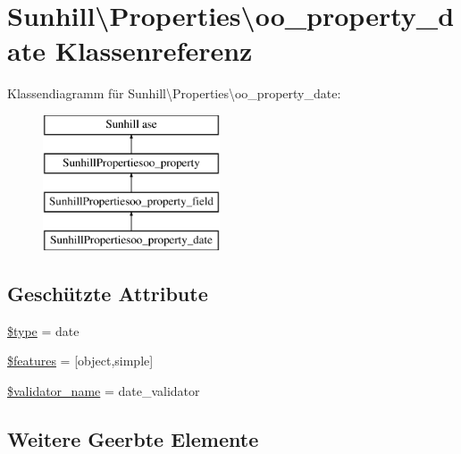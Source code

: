 \hypertarget{classSunhill_1_1Properties_1_1oo__property__date}{}\section{Sunhill\textbackslash{}Properties\textbackslash{}oo\+\_\+property\+\_\+date Klassenreferenz}
\label{classSunhill_1_1Properties_1_1oo__property__date}
Klassendiagramm für Sunhill\textbackslash{}Properties\textbackslash{}oo\+\_\+property\+\_\+date\+:\begin{figure}[H]
\begin{center}
\leavevmode
\includegraphics[height=4.000000cm]{d4/dde/classSunhill_1_1Properties_1_1oo__property__date}
\end{center}
\end{figure}
\subsection*{Geschützte Attribute}
\begin{DoxyCompactItemize}
\item 
\hyperlink{classSunhill_1_1Properties_1_1oo__property__date_a1aed1552ae192d12d6f59a058d6ac50a}{\$type} = \textquotesingle{}date\textquotesingle{}
\item 
\hyperlink{classSunhill_1_1Properties_1_1oo__property__date_afc5f8b1963651f2b96487c2b38d8a622}{\$features} = \mbox{[}\textquotesingle{}object\textquotesingle{},\textquotesingle{}simple\textquotesingle{}\mbox{]}
\item 
\hyperlink{classSunhill_1_1Properties_1_1oo__property__date_a9810f0ed2b04ee258939da0f21f8476f}{\$validator\+\_\+name} = \textquotesingle{}date\+\_\+validator\textquotesingle{}
\end{DoxyCompactItemize}
\subsection*{Weitere Geerbte Elemente}


